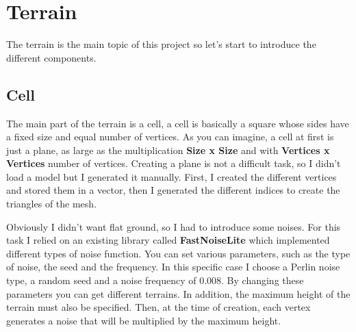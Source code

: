 \section{Terrain}

The terrain is the main topic of this project so let's start to introduce the different components.

\subsection{Cell}
\noindent
The main part of the terrain is a cell, a cell is basically a square whose sides have a fixed  size and equal number of vertices. As you can imagine, a cell at first is just a plane, as large as the multiplication \textbf {Size x Size} and with \textbf {Vertices x Vertices} number of vertices. Creating a plane is not a difficult task, so I didn't load a model but I generated it manually. First, I created the different vertices and stored them in a vector, then I generated the different indices to create the triangles of the mesh.

\begin{figure}[hbt!]
	\centering
	\qquad
	\caption{}
\end{figure}

\noindent
Obviously I didn't want flat ground, so I had to introduce some noises. For this task I relied on an existing library called \textbf{FastNoiseLite} which implemented different types of noise function. You can set various parameters, such as the type of noise, the seed and the frequency. In this specific case I choose a Perlin noise type, a random seed and a noise frequency of 0.008. By changing these parameters you can get different terrains.
In addition, the maximum height of the terrain must also be specified. Then, at the time of creation, each vertex generates a noise that will be multiplied by the maximum height.

